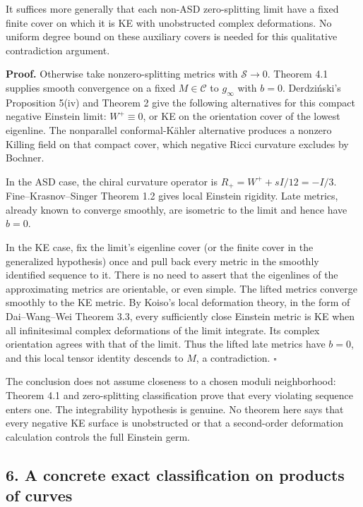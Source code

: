 \documentclass[
  11pt,
]{article}
\begin{document}
It suffices more generally that each non-ASD zero-splitting limit have a
fixed finite cover on which it is KE with unobstructed complex
deformations. No uniform degree bound on these auxiliary covers is
needed for this qualitative contradiction argument.

\textbf{Proof.} Otherwise take nonzero-splitting metrics with
\(\mathscr S\to0\). Theorem 4.1 supplies smooth convergence on a fixed
\(M\in\mathcal C\) to \(g_\infty\) with \(b=0\). Derdziński's
Proposition 5(iv) and Theorem 2 give the following alternatives for this
compact negative Einstein limit: \(W^+\equiv0\), or KE on the
orientation cover of the lowest eigenline. The nonparallel
conformal-Kähler alternative produces a nonzero Killing field on that
compact cover, which negative Ricci curvature excludes by Bochner.

In the ASD case, the chiral curvature operator is
\(R_+=W^++sI/12=-I/3\). Fine--Krasnov--Singer Theorem 1.2 gives local
Einstein rigidity. Late metrics, already known to converge smoothly, are
isometric to the limit and hence have \(b=0\).

In the KE case, fix the limit's eigenline cover (or the finite cover in
the generalized hypothesis) once and pull back every metric in the
smoothly identified sequence to it. There is no need to assert that the
eigenlines of the approximating metrics are orientable, or even simple.
The lifted metrics converge smoothly to the KE metric. By Koiso's local
deformation theory, in the form of Dai--Wang--Wei Theorem 3.3, every
sufficiently close Einstein metric is KE when all infinitesimal complex
deformations of the limit integrate. Its complex orientation agrees with
that of the limit. Thus the lifted late metrics have \(b=0\), and this
local tensor identity descends to \(M\), a contradiction. \(\square\)

The conclusion does not assume closeness to a chosen moduli
neighborhood: Theorem 4.1 and zero-splitting classification prove that
every violating sequence enters one. The integrability hypothesis is
genuine. No theorem here says that every negative KE surface is
unobstructed or that a second-order deformation calculation controls the
full Einstein germ.

\hypertarget{a-concrete-exact-classification-on-products-of-curves}{%
\subsection{6. A concrete exact classification on products of
curves}\label{a-concrete-exact-classification-on-products-of-curves}}
\end{document}
